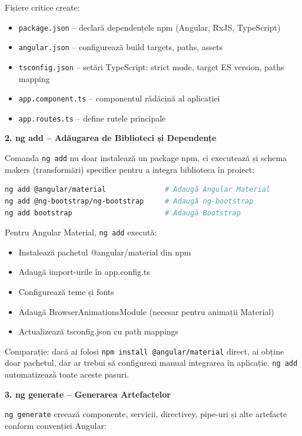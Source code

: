 Fișiere critice create:

\begin{itemize}
  \item \texttt{package.json} – declară dependențele npm (Angular, RxJS, TypeScript)
  \item \texttt{angular.json} – configurează build targets, paths, assets
  \item \texttt{tsconfig.json} – setări TypeScript: strict mode, target ES version, paths mapping
  \item \texttt{app.component.ts} – componentul rădăcină al aplicației
  \item \texttt{app.routes.ts} – define rutele principale
\end{itemize}

\textbf{2. ng add – Adăugarea de Biblioteci și Dependențe}

Comanda \texttt{ng add} nu doar instalează un package npm, ci executează și schema makers (transformări) specifice pentru a integra biblioteca în proiect:

\begin{lstlisting}[language=bash]
ng add @angular/material              # Adaugă Angular Material
ng add @ng-bootstrap/ng-bootstrap     # Adaugă ng-bootstrap
ng add bootstrap                      # Adaugă Bootstrap
\end{lstlisting}

Pentru Angular Material, \texttt{ng add} execută:
\begin{itemize}
  \item Instalează pachetul @angular/material din npm
  \item Adaugă import-urile în app.config.ts
  \item Configurează teme și fonts
  \item Adaugă BrowserAnimationsModule (necesar pentru animații Material)
  \item Actualizează tsconfig.json cu path mappings
\end{itemize}

Comparație: dacă ai folosi \texttt{npm install @angular/material} direct, ai obține doar pachetul, dar ar trebui să configurezi manual integrarea în aplicație. \texttt{ng add} automatizează toate aceste pasuri.

\textbf{3. ng generate – Generarea Artefactelor}

\texttt{ng generate} creează componente, servicii, directivey, pipe-uri și alte artefacte conform convenției Angular:

